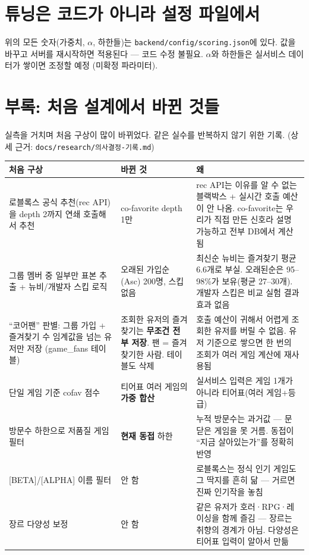\documentclass[11pt]{article}
\begin{document}
\section{튜닝은 코드가 아니라 설정 파일에서}

위의 모든 숫자(가중치, $\alpha$, 하한들)는 \texttt{backend/config/scoring.json}에 있다.
값을 바꾸고 서버를 재시작하면 적용된다 --- 코드 수정 불필요.
$\alpha$와 하한들은 실서비스 데이터가 쌓이면 조정할 예정 (미확정 파라미터).

\appendix
\section*{부록: 처음 설계에서 바뀐 것들}

실측을 거치며 처음 구상이 많이 바뀌었다. 같은 실수를 반복하지 않기 위한 기록.
(상세 근거: \texttt{docs/research/의사결정-기록.md})

\begin{center}
\small
\begin{tabular}{p{} p{} p{}}
\toprule
처음 구상 & 바뀐 것 & 왜 \\
\midrule
로블록스 공식 추천(rec API)을 depth 2까지 연쇄 호출해서 추천
& co-favorite depth 1만
& rec API는 이유를 알 수 없는 블랙박스 + 실시간 호출 예산이 안 나옴.
  co-favorite는 우리가 직접 만든 신호라 설명 가능하고 전부 DB에서 계산됨 \\
\midrule
그룹 멤버 중 일부만 표본 추출 + 뉴비/개발자 스킵 로직
& 오래된 가입순(Asc) 200명, 스킵 없음
& 최신순 뉴비는 즐겨찾기 평균 6.6개로 부실. 오래된순은 95--98\%가 보유(평균 27--30개).
  개발자 스킵은 비교 실험 결과 효과 없음 \\
\midrule
``코어팬'' 판별: 그룹 가입 + 즐겨찾기 수 임계값을 넘는 유저만 저장 (game\_fans 테이블)
& 조회한 유저의 즐겨찾기는 \textbf{무조건 전부 저장}. 팬 = 즐겨찾기한 사람. 테이블도 삭제
& 호출 예산이 귀해서 어렵게 조회한 유저를 버릴 수 없음. 유저 기준으로 쌓으면
  한 번의 조회가 여러 게임 계산에 재사용됨 \\
\midrule
단일 게임 기준 cofav 점수
& 티어표 여러 게임의 \textbf{가중 합산}
& 실서비스 입력은 게임 1개가 아니라 티어표(여러 게임+등급) \\
\midrule
방문수 하한으로 저품질 게임 필터
& \textbf{현재 동접} 하한
& 누적 방문수는 과거값 --- 문 닫은 게임을 못 거름. 동접이 ``지금 살아있는가''를 정확히 반영 \\
\midrule
{[BETA]/[ALPHA]} 이름 필터
& 안 함
& 로블록스는 정식 인기 게임도 그 딱지를 흔히 닮 --- 거르면 진짜 인기작을 놓침 \\
\midrule
장르 다양성 보정
& 안 함
& 같은 유저가 호러·RPG·레이싱을 함께 즐김 --- 장르는 취향의 경계가 아님.
  다양성은 티어표 입력이 알아서 만듦 \\
\bottomrule
\end{tabular}
\end{center}
\end{document}
